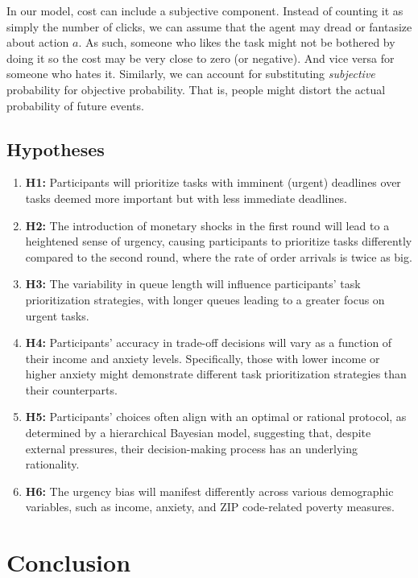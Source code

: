 \documentclass[
]{report}
\providecommand{\tightlist}{%
  \setlength{\itemsep}{0pt}\setlength{\parskip}{0pt}}\usepackage{longtable,booktabs,array}
\begin{document}
In our model, cost can include a subjective component. Instead of
counting it as simply the number of clicks, we can assume that the agent
may dread or fantasize about action \(a\). As such, someone who likes
the task might not be bothered by doing it so the cost may be very close
to zero (or negative). And vice versa for someone who hates it.
Similarly, we can account for substituting \emph{subjective} probability
for objective probability. That is, people might distort the actual
probability of future events.

\hypertarget{hypotheses-2}{%
\section{Hypotheses}\label{hypotheses-2}}

\begin{enumerate}
\def\labelenumi{\arabic{enumi}.}
\tightlist
\item
  \textbf{H1:} Participants will prioritize tasks with imminent (urgent)
  deadlines over tasks deemed more important but with less immediate
  deadlines.
\item
  \textbf{H2:} The introduction of monetary shocks in the first round
  will lead to a heightened sense of urgency, causing participants to
  prioritize tasks differently compared to the second round, where the
  rate of order arrivals is twice as big.
\item
  \textbf{H3:} The variability in queue length will influence
  participants' task prioritization strategies, with longer queues
  leading to a greater focus on urgent tasks.
\item
  \textbf{H4:} Participants' accuracy in trade-off decisions will vary
  as a function of their income and anxiety levels. Specifically, those
  with lower income or higher anxiety might demonstrate different task
  prioritization strategies than their counterparts.
\item
  \textbf{H5:} Participants' choices often align with an optimal or
  rational protocol, as determined by a hierarchical Bayesian model,
  suggesting that, despite external pressures, their decision-making
  process has an underlying rationality.
\item
  \textbf{H6:} The urgency bias will manifest differently across various
  demographic variables, such as income, anxiety, and ZIP code-related
  poverty measures.
\end{enumerate}

\hypertarget{conclusion}{%
\chapter{Conclusion}\label{conclusion}}
\end{document}
